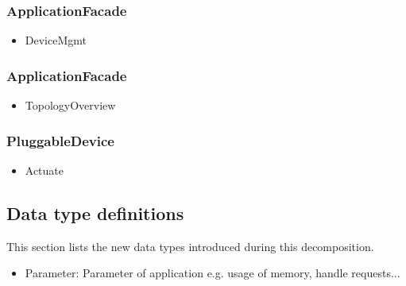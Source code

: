     \subsubsection{ApplicationFacade}
        \begin{itemize}
            \item DeviceMgmt
        \end{itemize}
    \subsubsection{ApplicationFacade}
        \begin{itemize}
            \item TopologyOverview
        \end{itemize}
    \subsubsection{PluggableDevice}
        \begin{itemize}
            \item Actuate
        \end{itemize}

\subsection{Data type definitions}
    This section lists the new data types introduced during this decomposition.

    \begin{itemize}
        \item Parameter: Parameter of application e.g. usage of memory, handle requests...
    \end{itemize}

